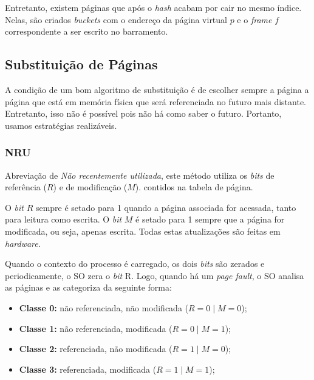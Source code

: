 Entretanto, existem páginas que após o \textit{hash} acabam por cair no mesmo índice. Nelas, são criados \textit{buckets} com o endereço da página virtual $p$ e o \textit{frame} $f$ correspondente a ser escrito no barramento.












\subsection{Substituição de Páginas}
A condição de um bom algoritmo de substituição é de escolher sempre a página a página que está em memória física que será referenciada no futuro mais distante. Entretanto, isso não é possível pois não há como saber o futuro. Portanto, usamos estratégias realizáveis.

\subsubsection{NRU}
Abreviação de \textit{Não recentemente utilizada}, este método utiliza os \textit{bits} de referência ($R$) e de modificação ($M$). contidos na tabela de página.

O \textit{bit} $R$ sempre é setado para 1 quando a página associada for acessada, tanto para leitura como escrita. O \textit{bit} $M$ é setado para 1 sempre que a página for modificada, ou seja, apenas escrita. Todas estas atualizações são feitas em \textit{hardware}.

Quando o contexto do processo é carregado, os dois \textit{bits} são zerados e periodicamente, o SO zera o \textit{bit} R. Logo, quando há um \textit{page fault}, o SO analisa as páginas e as categoriza da seguinte forma:

\begin{itemize}
  \item \textbf{Classe 0:} não referenciada, não modificada ($R = 0 \mid M = 0$);

  \item \textbf{Classe 1:} não referenciada, modificada ($R = 0 \mid M = 1$);

  \item \textbf{Classe 2:} referenciada, não modificada ($R = 1 \mid M = 0$);

  \item \textbf{Classe 3:} referenciada, modificada ($R = 1 \mid M = 1$);
\end{itemize}

